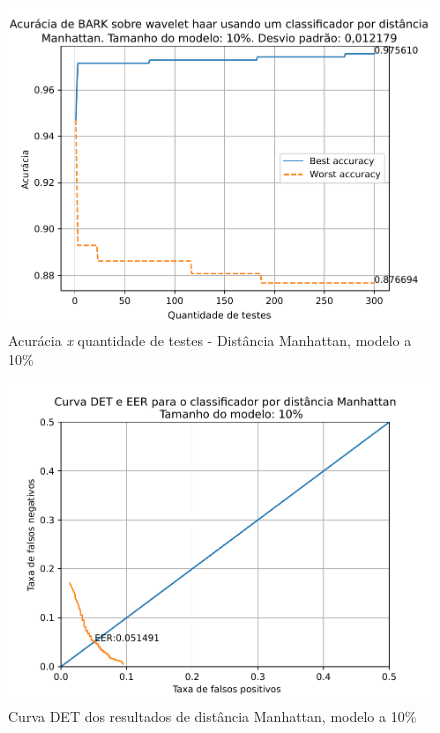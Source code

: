 			\begin{figure}[H]
				\centering
				\includegraphics[width=.9\linewidth]{images/results/confusionMatrices/classifier_Manhattan_10}
				\caption{Acurácia \textit{x} quantidade de testes - Distância Manhattan, modelo a 10\%}
				\label{fig:classifiermanhattan10}
			\end{figure}
		
			\begin{figure}[H]
				\centering
				\includegraphics[width=.9\linewidth]{images/results/det/DET_for_classifier_Manhattan_10}
				\caption{Curva DET dos resultados de distância Manhattan, modelo a 10\%}
				\label{fig:detforclassifiermanhattan10}
			\end{figure}
	
